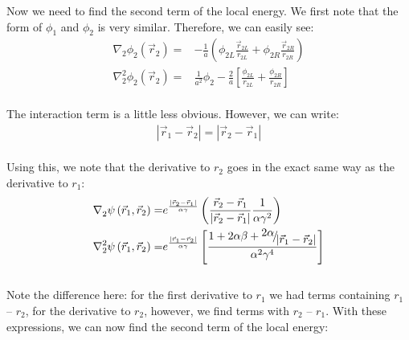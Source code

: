 Now we need to find the second term of the local energy. We first note that the form of $\phi_1$ and $\phi_2$ is very similar. Therefore, we can easily see:
\begin{align}
\nabla _2^{}{\phi _2}\left( {{{\vec r}_2}} \right) =&  - \frac{1}{a}\left( {{\phi _{2L}}\frac{{{{\vec r}_{2L}}}}{{{r_{2L}}}} + {\phi _{2R}}\frac{{{{\vec r}_{2R}}}}{{{r_{2R}}}}} \right)\nonumber\\
\nabla _2^2{\phi _2}\left( {{{\vec r}_2}} \right) =& \frac{1}{{{a^2}}}{\phi _2} - \frac{2}{a}\left[ {\frac{{{\phi _{2L}}}}{{{r_{2L}}}} + \frac{{{\phi _{2R}}}}{{{r_{2R}}}}} \right]
\end{align}\\
The interaction term is a little less obvious. However, we can write:
\begin{align}
\left| {{{\vec r}_1} - {{\vec r}_2}} \right| = \left| {{{\vec r}_2} - {{\vec r}_1}} \right|
\end{align}\\
Using this, we note that the derivative to $r_2$ goes in the exact same way as the derivative to $r_1$:
\begin{align}
\nabla _2^{}\psi \left( {{{\vec r}_1},{{\vec r}_2}} \right) =& {e^{\frac{{\left| {{{\vec r}_2} - {{\vec r}_1}} \right|}}{{\alpha \gamma }}}}\left( {\frac{{{{\vec r}_2} - {{\vec r}_1}}}{{\left| {{{\vec r}_2} - {{\vec r}_1}} \right|}}\frac{1}{{\alpha {\gamma ^2}}}} \right)\\
\nabla _2^2\psi \left( {{{\vec r}_1},{{\vec r}_2}} \right) =& {e^{\frac{{\left| {{{\vec r}_1} - {{\vec r}_2}} \right|}}{{\alpha \gamma }}}}\left[ {\frac{{1 + 2\alpha \beta  + {\raise0.7ex\hbox{${2\alpha }$} \!\mathord{\left/
 {\vphantom {{2\alpha } {\left| {{{\vec r}_1} - {{\vec r}_2}} \right|}}}\right.\kern-\nulldelimiterspace}
\!\lower0.7ex\hbox{${\left| {{{\vec r}_1} - {{\vec r}_2}} \right|}$}}}}{{{\alpha ^2}{\gamma ^4}}}} \right]
\end{align}\\
Note the difference here: for the first derivative to $r_1$ we had terms containing $r_1$ – $r_2$, for the derivative to $r_2$, however, we find terms with $r_2$ – $r_1$.
With these expressions, we can now find the second term of the local energy:

